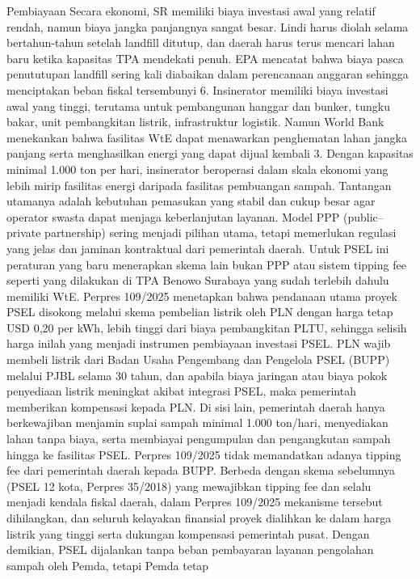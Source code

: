 \documentclass[
  letterpaper,
  DIV=11,
  numbers=noendperiod]{scrreprt}
\begin{document}
Pembiayaan Secara ekonomi, SR memiliki biaya investasi awal yang relatif
rendah, namun biaya jangka panjangnya sangat besar. Lindi harus diolah
selama bertahun-tahun setelah landfill ditutup, dan daerah harus terus
mencari lahan baru ketika kapasitas TPA mendekati penuh. EPA mencatat
bahwa biaya pasca penututupan landfill sering kali diabaikan dalam
perencanaan anggaran sehingga menciptakan beban fiskal tersembunyi 6.
Insinerator memiliki biaya investasi awal yang tinggi, terutama untuk
pembangunan hanggar dan bunker, tungku bakar, unit pembangkitan listrik,
infrastruktur logistik. Namun World Bank menekankan bahwa fasilitas WtE
dapat menawarkan penghematan lahan jangka panjang serta menghasilkan
energi yang dapat dijual kembali 3. Dengan kapasitas minimal 1.000 ton
per hari, insinerator beroperasi dalam skala ekonomi yang lebih mirip
fasilitas energi daripada fasilitas pembuangan sampah. Tantangan
utamanya adalah kebutuhan pemasukan yang stabil dan cukup besar agar
operator swasta dapat menjaga keberlanjutan layanan. Model PPP
(public--private partnership) sering menjadi pilihan utama, tetapi
memerlukan regulasi yang jelas dan jaminan kontraktual dari pemerintah
daerah. Untuk PSEL ini peraturan yang baru menerapkan skema lain bukan
PPP atau sistem tipping fee seperti yang dilakukan di TPA Benowo
Surabaya yang sudah terlebih dahulu memiliki WtE. Perpres 109/2025
menetapkan bahwa pendanaan utama proyek PSEL disokong melalui skema
pembelian listrik oleh PLN dengan harga tetap USD 0,20 per kWh, lebih
tinggi dari biaya pembangkitan PLTU, sehingga selisih harga inilah yang
menjadi instrumen pembiayaan investasi PSEL. PLN wajib membeli listrik
dari Badan Usaha Pengembang dan Pengelola PSEL (BUPP) melalui PJBL
selama 30 tahun, dan apabila biaya jaringan atau biaya pokok penyediaan
listrik meningkat akibat integrasi PSEL, maka pemerintah memberikan
kompensasi kepada PLN. Di sisi lain, pemerintah daerah hanya
berkewajiban menjamin suplai sampah minimal 1.000 ton/hari, menyediakan
lahan tanpa biaya, serta membiayai pengumpulan dan pengangkutan sampah
hingga ke fasilitas PSEL. Perpres 109/2025 tidak memandatkan adanya
tipping fee dari pemerintah daerah kepada BUPP. Berbeda dengan skema
sebelumnya (PSEL 12 kota, Perpres 35/2018) yang mewajibkan tipping fee
dan selalu menjadi kendala fiskal daerah, dalam Perpres 109/2025
mekanisme tersebut dihilangkan, dan seluruh kelayakan finansial proyek
dialihkan ke dalam harga listrik yang tinggi serta dukungan kompensasi
pemerintah pusat. Dengan demikian, PSEL dijalankan tanpa beban
pembayaran layanan pengolahan sampah oleh Pemda, tetapi Pemda tetap
\end{document}
